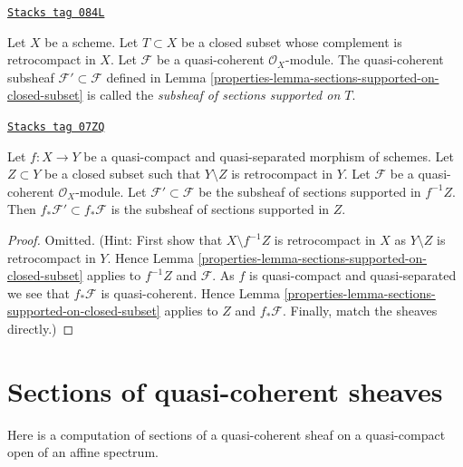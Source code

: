\begin{definition}
\label{properties-definition-subsheaf-sections-supported-on-closed}
\href{https://stacks.math.columbia.edu/tag/084L}{\texttt{Stacks tag 084L}}

Let $X$ be a scheme.
Let $T \subset X$ be a closed subset whose complement
is retrocompact in $X$.
Let $\mathcal{F}$ be a quasi-coherent $\mathcal{O}_X$-module.
The quasi-coherent subsheaf $\mathcal{F}' \subset \mathcal{F}$ defined in
Lemma \ref{properties-lemma-sections-supported-on-closed-subset} is called
the {\it subsheaf of sections supported on $T$}.
\end{definition}

\begin{lemma}
\label{properties-lemma-push-sections-supported-on-closed-subset}
\href{https://stacks.math.columbia.edu/tag/07ZQ}{\texttt{Stacks tag 07ZQ}}

Let $f : X \to Y$ be a quasi-compact and quasi-separated morphism
of schemes. Let $Z \subset Y$ be a closed subset such that
$Y \setminus Z$ is retrocompact in $Y$. Let $\mathcal{F}$ be a quasi-coherent
$\mathcal{O}_X$-module. Let $\mathcal{F}' \subset \mathcal{F}$
be the subsheaf of sections supported in $f^{-1}Z$.
Then $f_*\mathcal{F}' \subset f_*\mathcal{F}$ is the subsheaf
of sections supported in $Z$.
\end{lemma}

\begin{proof}

Omitted. (Hint: First show that $X \setminus f^{-1}Z$ is retrocompact
in $X$ as $Y \setminus Z$ is retrocompact in $Y$. Hence
Lemma \ref{properties-lemma-sections-supported-on-closed-subset}
applies to $f^{-1}Z$ and $\mathcal{F}$. As $f$ is quasi-compact and
quasi-separated we see that $f_*\mathcal{F}$ is quasi-coherent.
Hence Lemma \ref{properties-lemma-sections-supported-on-closed-subset}
applies to $Z$ and $f_*\mathcal{F}$. Finally, match the sheaves
directly.)
\end{proof}

\section{Sections of quasi-coherent sheaves}
\label{properties-section-sections-quasi-coherent}
Here is a computation of sections of a quasi-coherent sheaf on a quasi-compact
open of an affine spectrum.

